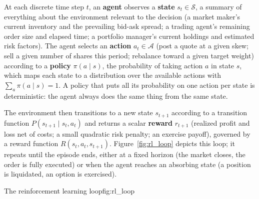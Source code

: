 \documentclass[../ai_in_finance]{subfiles}
\begin{document}
At each discrete time step $t$, an \textbf{agent} observes a \textbf{state} $s_t \in \mathcal{S}$, a summary of everything about the environment relevant to the decision (a market maker's current inventory and the prevailing bid-ask spread; a trading agent's remaining order size and elapsed time; a portfolio manager's current holdings and estimated risk factors). The agent selects an \textbf{action} $a_t \in \mathcal{A}$ (post a quote at a given skew; sell a given number of shares this period; rebalance toward a given target weight) according to a \textbf{policy} $\pi(a \mid s)$, the probability of taking action $a$ in state $s$, which maps each state to a distribution over the available actions with $\sum_a \pi(a \mid s) = 1$. A policy that puts all its probability on one action per state is deterministic: the agent always does the same thing from the same state.

The environment then transitions to a new state $s_{t+1}$ according to a transition function $P(s_{t+1} \mid s_t, a_t)$ and returns a scalar \textbf{reward} $r_{t+1}$ (realized profit and loss net of costs; a small quadratic risk penalty; an exercise payoff), governed by a reward function $R(s_t, a_t, s_{t+1})$. Figure~\ref{fig:rl_loop} depicts this loop; it repeats until the episode ends, either at a fixed horizon (the market closes, the order is fully executed) or when the agent reaches an absorbing state (a position is liquidated, an option is exercised).

\begin{bookfigure}[htbp]{The reinforcement learning loop}{fig:rl_loop}
\end{bookfigure}
\end{document}
